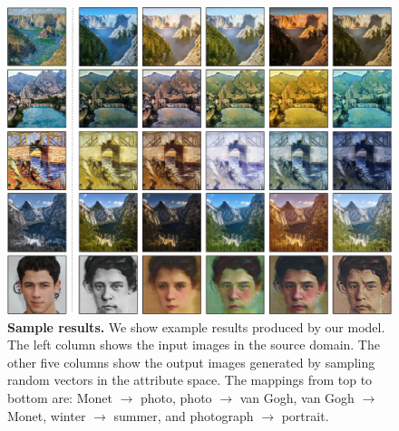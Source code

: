 \documentclass[runningheads]{llncs}
\begin{document}
\begin{figure}[t]
	\centering
     \hfill{}
    \includegraphics[width=\linewidth]{Figures/Diversity2.pdf}
    \caption{\textbf{Sample results.} We show example results produced by our model. The left column shows the input images in the source domain. The other five columns show the output images generated by sampling random vectors in the attribute space. 
    The mappings from top to bottom are: Monet $\rightarrow$ photo, photo $\rightarrow$ van Gogh, van Gogh  $\rightarrow$ Monet, winter $\rightarrow$ summer, and photograph $\rightarrow$ portrait.
    }
    \label{figure:example}
    \vspace{\figmargin}
 \end{figure}
\end{document}
